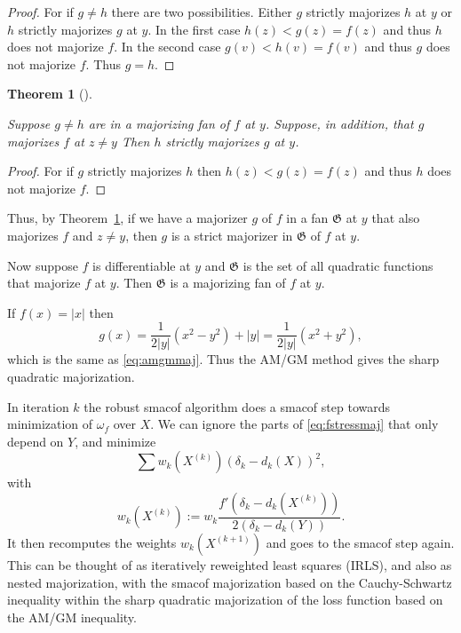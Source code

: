\documentclass[
  12pt,
  letterpaper,
  DIV=11,
  numbers=noendperiod]{scrartcl}
\theoremstyle{plain}
\newtheorem{theorem}{Theorem}[section]
\theoremstyle{plain}
\theoremstyle{plain}
\theoremstyle{definition}
\theoremstyle{remark}
\begin{document}
\begin{proof}
For if \(g\not= h\) there are two possibilities. Either \(g\) strictly
majorizes \(h\) at \(y\) or \(h\) strictly majorizes \(g\) at \(y\). In
the first case \(h(z)<g(z)=f(z)\) and thus \(h\) does not majorize
\(f\). In the second case \(g(v)<h(v)=f(v)\) and thus \(g\) does not
majorize \(f\). Thus \(g=h\).
\end{proof}

\begin{theorem}[]\protect\hypertarget{thm-ruit}{}\label{thm-ruit}

Suppose \(g\not= h\) are in a majorizing fan of \(f\) at \(y\). Suppose,
in addition, that \(g\) majorizes \(f\) at \(z\not=y\) Then \(h\)
strictly majorizes \(g\) at \(y\).

\end{theorem}

\begin{proof}
For if \(g\) strictly majorizes \(h\) then \(h(z)<g(z)=f(z)\) and thus
\(h\) does not majorize \(f\).
\end{proof}

Thus, by Theorem~\ref{thm-ruit}, if we have a majorizer \(g\) of \(f\)
in a fan \(\mathfrak{G}\) at \(y\) that also majorizes \(f\) and
\(z\not= y\), then \(g\) is a strict majorizer in \(\mathfrak{G}\) of
\(f\) at \(y\).

Now suppose \(f\) is differentiable at \(y\) and \(\mathfrak{G}\) is the
set of all quadratic functions that majorize \(f\) at \(y\). Then
\(\mathfrak{G}\) is a majorizing fan of \(f\) at \(y\).

If \(f(x)=|x|\) then \begin{equation}
g(x)=\frac{1}{2|y|}(x^2-y^2)+|y|=\frac{1}{2|y|}(x^2+y^2),\label{eq:abssharp}
\end{equation} which is the same as \eqref{eq:amgmmaj}. Thus the AM/GM
method gives the sharp quadratic majorization.

In iteration \(k\) the robust smacof algorithm does a smacof step
towards minimization of \(\omega_f\) over \(X\). We can ignore the parts
of \eqref{eq:fstressmaj} that only depend on \(Y\), and minimize
\begin{equation}
\sum w_k(X^{(k)})(\delta_k-d_k(X))^2,\label{eq:fstressaux}
\end{equation} with \begin{equation}
w_k(X^{(k)}):=w_k\frac{f'(\delta_k-d_k(X^{(k)}))}{2(\delta_k-d_k(Y))}.\label{eq:wkdef}
\end{equation} It then recomputes the weights \(w_k(X^{(k+1)})\) and
goes to the smacof step again. This can be thought of as iteratively
reweighted least squares (IRLS), and also as nested majorization, with
the smacof majorization based on the Cauchy-Schwartz inequality within
the sharp quadratic majorization of the loss function based on the AM/GM
inequality.
\end{document}
